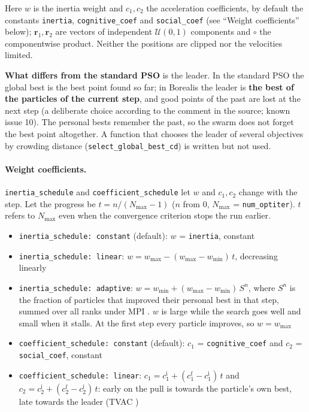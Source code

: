 \documentclass[11pt,a4paper]{article}
\begin{document}
Here $w$ is the inertia weight and $c_1, c_2$ the acceleration coefficients, by default the constants \texttt{inertia}, \texttt{cognitive\_coef} and \texttt{social\_coef} (see ``Weight coefficients'' below); $\mathbf{r}_1, \mathbf{r}_2$ are vectors of independent $\mathcal{U}(0,1)$ components and $\circ$ the componentwise product. Neither the positions are clipped nor the velocities limited.

\textbf{What differs from the standard PSO} is the leader. In the standard PSO the global best is the best point found so far; in Borealis the leader is \textbf{the best of the particles of the current step}, and good points of the past are lost at the next step (a deliberate choice according to the comment in the source; known issue 10). The personal bests remember the past, so the swarm does not forget the best point altogether. A function that chooses the leader of several objectives by crowding distance (\texttt{select\_global\_best\_cd}) is written but not used.

\paragraph{Weight coefficients.} \texttt{inertia\_schedule} and \texttt{coefficient\_schedule} let $w$ and $c_1, c_2$ change with the step. Let the progress be $t = n / (N_{\max} - 1)$ ($n$ from 0, $N_{\max}$ = \texttt{num\_optiter}). $t$ refers to $N_{\max}$ even when the convergence criterion stops the run earlier.

\begin{itemize}
\item \texttt{inertia\_schedule: constant} (default): $w$ = \texttt{inertia}, constant
\item \texttt{inertia\_schedule: linear}: $w = w_{\max} - (w_{\max} - w_{\min})\,t$, decreasing linearly \cite{shi1999}
\item \texttt{inertia\_schedule: adaptive}: $w = w_{\min} + (w_{\max} - w_{\min})\,S^n$, where $S^n$ is the fraction of particles that improved their personal best in that step, summed over all ranks under MPI \cite{nickabadi2011}. $w$ is large while the search goes well and small when it stalls. At the first step every particle improves, so $w = w_{\max}$
\item \texttt{coefficient\_schedule: constant} (default): $c_1$ = \texttt{cognitive\_coef} and $c_2$ = \texttt{social\_coef}, constant
\item \texttt{coefficient\_schedule: linear}: $c_1 = c_1^{\mathrm{i}} + (c_1^{\mathrm{f}} - c_1^{\mathrm{i}})\,t$ and $c_2 = c_2^{\mathrm{i}} + (c_2^{\mathrm{f}} - c_2^{\mathrm{i}})\,t$: early on the pull is towards the particle's own best, late towards the leader (TVAC \cite{ratnaweera2004})
\end{itemize}
\end{document}
